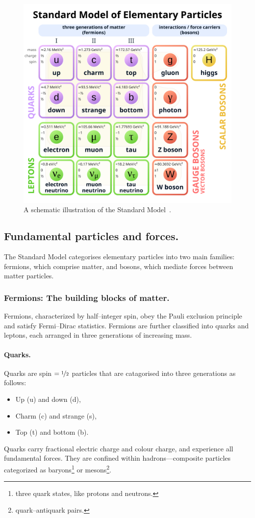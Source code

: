 \begin{definition}
\begin{figure}
    \centering
    \includegraphics[width=0.5\linewidth]{figures/chapter-01/Standard_Model_of_Elementary_Particles.svg.png}
    \caption{
        A schematic illustration of the Standard Model~\cite{wiki:stdmodel}.
    }
    \label{fig:sm}
\end{figure}
\subsection{Fundamental particles and forces.}
The Standard Model categorises elementary particles into two main families: fermions, which comprise matter, and bosons, which mediate forces between matter particles.
\subsubsection{Fermions: The building blocks of matter.}
Fermions, characterized by half--integer spin, obey the Pauli exclusion principle and satisfy Fermi--Dirac statistics.
%
Fermions are further classified into quarks and leptons, each arranged in three generations of increasing mass.
\paragraph{Quarks.}
Quarks are spin $ = \nicefrac{1}{2}$ particles that are catagorised into three generations as follows:
\begin{itemize}
    \item Up (u) and down (d),
    \item Charm (c) and strange (s),
    \item Top (t) and bottom (b).
\end{itemize}

Quarks carry fractional electric charge and colour charge, and experience all fundamental forces.
%
They are confined within hadrons---composite particles categorized as baryons\footnote{three quark states, like protons and neutrons.} or mesons\footnote{quark--antiquark pairs.}.


\end{definition}
